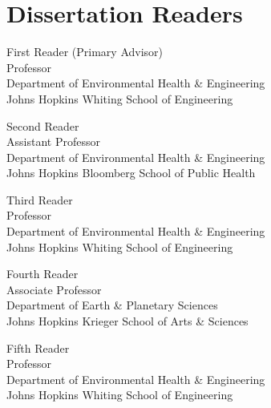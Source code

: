 \chapter*{Dissertation Readers}

\begin{singlespace}

\noindent First Reader (Primary Advisor)\\
\indent Professor\\
\indent Department of Environmental Health & Engineering\\
\indent Johns Hopkins Whiting School of Engineering\\
\medskip

\noindent Second Reader\\
\indent Assistant Professor\\
\indent Department of Environmental Health \& Engineering\\
\indent Johns Hopkins Bloomberg School of Public Health\\
\medskip

\noindent Third Reader\\
\indent Professor \\
\indent Department of Environmental Health \& Engineering\\
\indent Johns Hopkins Whiting School of Engineering\\
\medskip

\noindent Fourth Reader\\
\indent Associate Professor\\
\indent Department of Earth & Planetary Sciences\\
\indent Johns Hopkins Krieger School of Arts \& Sciences\\
\medskip

\noindent Fifth Reader\\
\indent Professor\\
\indent Department of Environmental Health \& Engineering\\
\indent Johns Hopkins Whiting School of Engineering\\
\medskip 

\end{singlespace}

\newpage 
